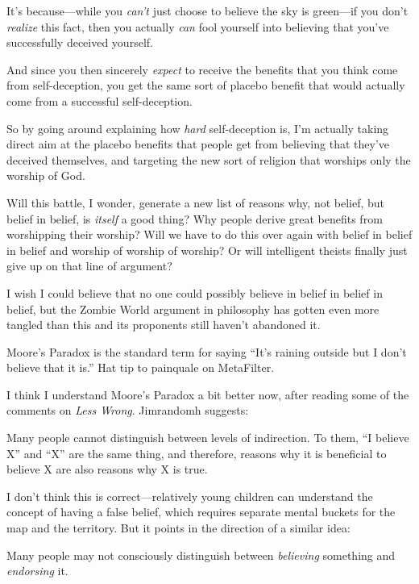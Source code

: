{
 It's because---while you
\textit{can't} just choose to believe the sky is
green---if you don't \textit{realize} this fact, then
you actually \textit{can} fool yourself into believing that
you've successfully deceived yourself.}

{
 And since you then sincerely \textit{expect} to receive the
benefits that you think come from self-deception, you get the same sort
of placebo benefit that would actually come from a successful
self-deception.}

{
 So by going around explaining how \textit{hard} self-deception is,
I'm actually taking direct aim at the placebo benefits
that people get from believing that they've deceived
themselves, and targeting the new sort of religion that worships only
the worship of God.}

{
 Will this battle, I wonder, generate a new list of reasons why,
not belief, but belief in belief, is \textit{itself} a good thing? Why
people derive great benefits from worshipping their worship? Will we
have to do this over again with belief in belief in belief and worship
of worship of worship? Or will intelligent theists finally just give up
on that line of argument?}

{
 I wish I could believe that no one could possibly believe in
belief in belief in belief, but the Zombie World argument in philosophy
has gotten even more tangled than this and its proponents still
haven't abandoned it.}

\myendsectiontext


\bigskip


{
 Moore's Paradox is the standard term for saying
``It's raining outside but I
don't believe that it is.'' Hat tip
to painquale on MetaFilter. }

{
 I think I understand Moore's Paradox a bit better
now, after reading some of the comments on \textit{Less Wrong}.
Jimrandomh suggests:}

{
 Many people cannot distinguish between levels of indirection. To
them, ``I believe X'' and
``X'' are the same thing, and
therefore, reasons why it is beneficial to believe X are also reasons
why X is true.}

{
 I don't think this is correct---relatively young
children can understand the concept of having a false belief, which
requires separate mental buckets for the map and the territory. But it
points in the direction of a similar idea:}

{
 Many people may not consciously distinguish between
\textit{believing} something and \textit{endorsing} it.}

